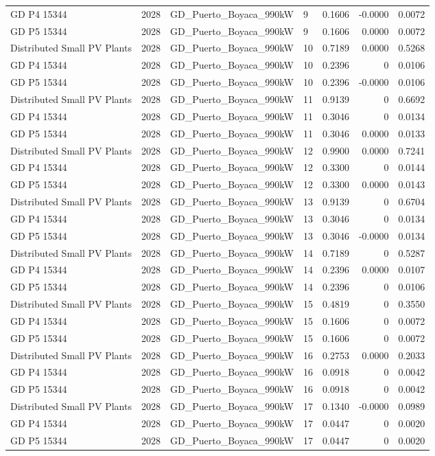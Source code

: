 \documentclass[11pt,a4paper]{article}
\begin{document}
\begin{longtable}{llllrrr}
GD P4 15344 & 2028 & GD\_Puerto\_Boyaca\_990kW & 9 & 0.1606 & -0.0000 & 0.0072 \\
GD P5 15344 & 2028 & GD\_Puerto\_Boyaca\_990kW & 9 & 0.1606 & 0.0000 & 0.0072 \\
Distributed Small PV Plants & 2028 & GD\_Puerto\_Boyaca\_990kW & 10 & 0.7189 & 0.0000 & 0.5268 \\
GD P4 15344 & 2028 & GD\_Puerto\_Boyaca\_990kW & 10 & 0.2396 & 0 & 0.0106 \\
GD P5 15344 & 2028 & GD\_Puerto\_Boyaca\_990kW & 10 & 0.2396 & -0.0000 & 0.0106 \\
Distributed Small PV Plants & 2028 & GD\_Puerto\_Boyaca\_990kW & 11 & 0.9139 & 0 & 0.6692 \\
GD P4 15344 & 2028 & GD\_Puerto\_Boyaca\_990kW & 11 & 0.3046 & 0 & 0.0134 \\
GD P5 15344 & 2028 & GD\_Puerto\_Boyaca\_990kW & 11 & 0.3046 & 0.0000 & 0.0133 \\
Distributed Small PV Plants & 2028 & GD\_Puerto\_Boyaca\_990kW & 12 & 0.9900 & 0.0000 & 0.7241 \\
GD P4 15344 & 2028 & GD\_Puerto\_Boyaca\_990kW & 12 & 0.3300 & 0 & 0.0144 \\
GD P5 15344 & 2028 & GD\_Puerto\_Boyaca\_990kW & 12 & 0.3300 & 0.0000 & 0.0143 \\
Distributed Small PV Plants & 2028 & GD\_Puerto\_Boyaca\_990kW & 13 & 0.9139 & 0 & 0.6704 \\
GD P4 15344 & 2028 & GD\_Puerto\_Boyaca\_990kW & 13 & 0.3046 & 0 & 0.0134 \\
GD P5 15344 & 2028 & GD\_Puerto\_Boyaca\_990kW & 13 & 0.3046 & -0.0000 & 0.0134 \\
Distributed Small PV Plants & 2028 & GD\_Puerto\_Boyaca\_990kW & 14 & 0.7189 & 0 & 0.5287 \\
GD P4 15344 & 2028 & GD\_Puerto\_Boyaca\_990kW & 14 & 0.2396 & 0.0000 & 0.0107 \\
GD P5 15344 & 2028 & GD\_Puerto\_Boyaca\_990kW & 14 & 0.2396 & 0 & 0.0106 \\
Distributed Small PV Plants & 2028 & GD\_Puerto\_Boyaca\_990kW & 15 & 0.4819 & 0 & 0.3550 \\
GD P4 15344 & 2028 & GD\_Puerto\_Boyaca\_990kW & 15 & 0.1606 & 0 & 0.0072 \\
GD P5 15344 & 2028 & GD\_Puerto\_Boyaca\_990kW & 15 & 0.1606 & 0 & 0.0072 \\
Distributed Small PV Plants & 2028 & GD\_Puerto\_Boyaca\_990kW & 16 & 0.2753 & 0.0000 & 0.2033 \\
GD P4 15344 & 2028 & GD\_Puerto\_Boyaca\_990kW & 16 & 0.0918 & 0 & 0.0042 \\
GD P5 15344 & 2028 & GD\_Puerto\_Boyaca\_990kW & 16 & 0.0918 & 0 & 0.0042 \\
Distributed Small PV Plants & 2028 & GD\_Puerto\_Boyaca\_990kW & 17 & 0.1340 & -0.0000 & 0.0989 \\
GD P4 15344 & 2028 & GD\_Puerto\_Boyaca\_990kW & 17 & 0.0447 & 0 & 0.0020 \\
GD P5 15344 & 2028 & GD\_Puerto\_Boyaca\_990kW & 17 & 0.0447 & 0 & 0.0020 \\
\end{longtable}
\end{document}
